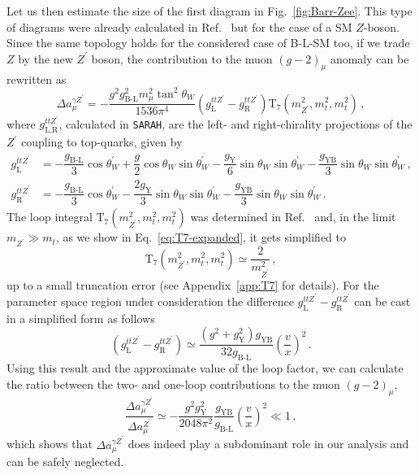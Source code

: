 \documentclass[a4paper,11pt]{article}
\renewcommand{\(}{\left(}
\renewcommand{\)}{\right)}
\renewcommand{\[}{\left[}
\renewcommand{\]}{\right]}
\newcommand{\ro}[1]{\textrm{#1}}
\begin{document}
Let us then estimate the size of the first diagram in Fig.~\ref{fig:Barr-Zee}. This type of diagrams were already calculated in Ref.~\cite{Feng:2009gn} but for the case of a SM $Z$-boson. Since the same topology holds for the considered case of B-L-SM too, 
if we trade $Z$ by the new $Z^\prime$ boson, the contribution to the muon $(g-2)_\mu$ anomaly can be rewritten as
\begin{equation}
    \Delta a_\mu^{\gamma Z^\prime} = -\dfrac{g^2 g^2_\ro{B-L} m_\mu^2 \tan^2{\theta_W}}{1536 \pi^4} \(g_\ro{L}^{ttZ^\prime} - g_\ro{R}^{ttZ^\prime}\) \ro{T}_7\( m_{Z^\prime}^2, m_t^2, m_t^2 \)\,,
    \label{eq:agZ}
\end{equation}
where $g_\ro{L,R}^{ttZ^\prime}$, calculated in \texttt{SARAH}, are the left- and right-chirality projections of the $Z^\prime$ coupling to top-quarks, given by
\begin{equation}
\begin{aligned}
    g_\ro{L}^{ttZ^\prime} &= -\dfrac{g_\ro{B-L}}{3} \cos{\theta_W^\prime} + \dfrac{g}{2} \cos{\theta_W} \sin{\theta_W^\prime} - \dfrac{g_\ro{Y}}{6} \sin{\theta_W} \sin{\theta_W^\prime} - \dfrac{g_\ro{YB}}{3} \sin{\theta_W} \sin{\theta_W^\prime}\,,
    \\
    g_\ro{R}^{ttZ^\prime} &= -\dfrac{g_\ro{B-L}}{3} \cos{\theta_W^\prime} - \dfrac{2 g_\ro{Y}}{3} \sin{\theta_W} \sin{\theta_W^\prime} - \dfrac{g_\ro{YB}}{3} \sin{\theta_W} \sin{\theta_W^\prime}\,.
\end{aligned}
\end{equation}
The loop integral $\ro{T}_7 \(m_{Z^\prime}^2, m_t^2, m_t^2\)$ was determined in Ref.~\cite{Feng:2009gn} and, in the limit $m_{Z^\prime} \gg m_t$, as we show in Eq.~\eqref{eq:T7-expanded}, it gets simplified to
\begin{equation}
    \ro{T}_7 \(m_{Z^\prime}^2, m_t^2, m_t^2\) \simeq \frac{2}{m_{Z^\prime}^2} \,,
    \label{eq:T7}
\end{equation}
up to a small truncation error (see Appendix~\ref{app:T7} for details). For the parameter space region under consideration the difference $g_\ro{L}^{ttZ^\prime} - g_\ro{R}^{ttZ^\prime}$ can be cast in a simplified form as follows 
\begin{equation}
    \(g_\ro{L}^{ttZ^\prime} - g_\ro{R}^{ttZ^\prime}\) \simeq \dfrac{\(g^2+g_\ro{Y}^2\)g_\ro{YB}}{32 g_\ro{B-L}} \(\dfrac{v}{x}\)^2\,.
    \label{eq:gLminusgR}
\end{equation}
Using this result and the approximate value of the loop factor, we can calculate the ratio between 
the two- and one-loop contributions to the muon $(g-2)_{\mu}$,
\begin{equation}
    \dfrac{\Delta a_\mu^{\gamma Z^\prime}}{\Delta a_\mu^{Z^\prime}} \simeq -\dfrac{g^2 g_\ro{Y}^2}{2048 \pi^2} \dfrac{g_\ro{YB}}{g_\ro{B-L}} \( \dfrac{v}{x} \)^2 \ll 1\,,
\end{equation}
which shows that $\Delta a_\mu^{\gamma Z^\prime}$ does indeed play a subdominant role in our analysis and can be safely neglected.
\end{document}

